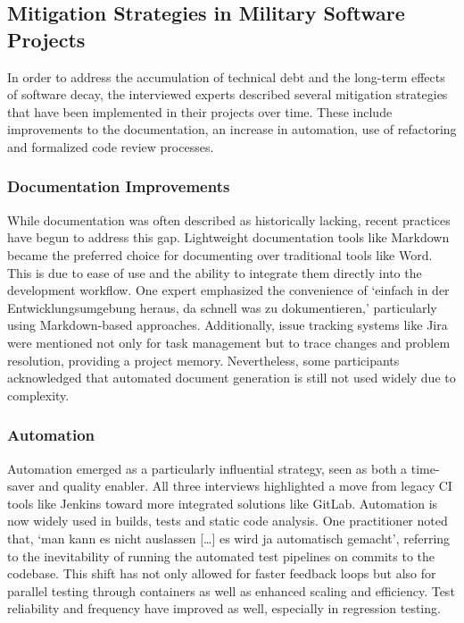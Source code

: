\subsection{Mitigation Strategies in Military Software Projects}
In order to address the accumulation of technical debt and the long-term effects of software decay, the interviewed experts described several mitigation strategies that have been implemented in their projects over time. These include improvements to the documentation, an increase in automation,
use of refactoring and formalized code review processes.

\subsubsection{Documentation Improvements}
While documentation was often described as historically lacking, recent practices have begun to address this gap. Lightweight documentation tools like Markdown became the preferred choice for documenting over traditional tools like Word. This is due to ease of use and the ability to integrate 
them directly into the development workflow. One expert emphasized the convenience of `einfach in der Entwicklungsumgebung heraus, da schnell was zu dokumentieren,' particularly using Markdown-based approaches. Additionally, issue tracking systems like Jira were mentioned not only for task management
but to trace changes and problem resolution, providing a project memory. Nevertheless, some participants acknowledged that automated document generation is still not used widely due to complexity.\\

\subsubsection{Automation}
Automation emerged as a particularly influential strategy, seen as both a time-saver and quality enabler. All three interviews highlighted a move from legacy CI tools like Jenkins toward more integrated solutions like GitLab. Automation is now widely used in builds, tests and static code analysis.
One practitioner noted that, `man kann es nicht auslassen [\ldots] es wird ja automatisch gemacht', referring to the inevitability of running the automated test pipelines on commits to the codebase. This shift has not only allowed for faster feedback loops but also for parallel testing through
containers as well as enhanced scaling and efficiency. Test reliability and frequency have improved as well, especially in regression testing.\\

